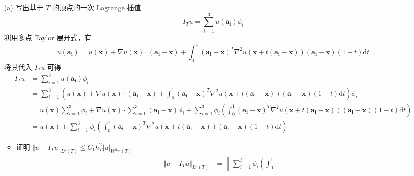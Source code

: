 \documentclass[a4paper]{article}
\begin{document}
\begin{enumerate}
    \item[(a)]  写出基于 $T$ 的顶点的一次 Lagrange 插值
                \begin{equation}
                    I_T u =  \sum_{i=1}^{3} u(\bm{a_i}) \phi_i
                \end{equation}
                利用多点 Taylor 展开式，有
                \begin{equation}
                    u(\bm{a_i}) = u(\bm{x}) + \nabla u(\bm{x}) \cdot (\bm{a_i} - \bm{x})
                    + \int_{0}^{1} (\bm{a_i} - \bm{x})^T \nabla^2 u(\bm{x} + t(\bm{a_i} - \bm{x}))
                    (\bm{a_i} - \bm{x})(1-t) \text{d}t
                \end{equation}
                将其代入 $I_T u$ 可得
                \begin{equation}
                    \begin{aligned}
                        I_T u 
                        &=  \sum_{i=1}^{3} u(\bm{a_i}) \phi_i\\
                        &=  \sum_{i=1}^{3} \left( u(\bm{x}) + \nabla u(\bm{x}) 
                        \cdot (\bm{a_i} - \bm{x}) + \int_{0}^{1} (\bm{a_i} - \bm{x})^T \nabla^2 u(\bm{x} + t(\bm{a_i} - \bm{x})) (\bm{a_i} - \bm{x})(1-t) \text{d}t \right) \phi_i\\
                        &= u(\bm{x}) \sum_{i=1}^{3} \phi_i
                        + \nabla u(\bm{x}) \cdot \sum_{i=1}^{3} (\bm{a_i} - \bm{x}) \phi_i
                        + \sum_{i=1}^{3}\phi_i \left( \int_{0}^{1} (\bm{a_i} - \bm{x})^T \nabla^2 u(\bm{x} + t(\bm{a_i} - \bm{x})) (\bm{a_i
                        } - \bm{x})(1-t) \text{d}t \right) \\
                        &=u(\bm{x})+\sum_{i=1}^{3}\phi_i \left( \int_{0}^{1} (\bm{a_i} - \bm{x})^T \nabla^2 u(\bm{x} + t(\bm{a_i} - \bm{x})) (\bm{a_i
                        } - \bm{x})(1-t) \text{d}t \right)
                    \end{aligned}
                \end{equation}
                \begin{itemize}
                    \item 证明 $\Vert u-I_T u  \Vert_{L^p(T)} \leq C_1 h_T^2 |u|_{W^{2,p}(T)}$
                        \begin{equation}
                            \begin{aligned}
                                \Vert u-I_T u  \Vert_{L^p(T)}
                                &=\left\| \sum_{i=1}^{3}\phi_i \left( \int_{0}^{1
}
\end{aligned}
\end{equation}
\end{itemize}
\end{enumerate}
\end{document}
